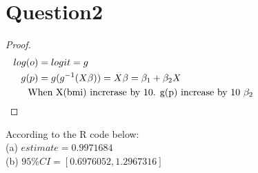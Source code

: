 \documentclass[15pt,a4paper]{article}\usepackage[]{graphicx}\usepackage[]{color}
\begin{document}
\section{Question2}
\begin{proof}
    \begin{align*}
    log(o) &= logit = g\\
    g(p) &= g(g^{-1}(X\beta)) = X\beta = \beta_1 + \beta_2 X\\
    \noalign{\text{When X(bmi) increrase by 10. g(p) increase by $10\ \beta_2$}}
    \end{align*}
\end{proof}
According to the R code below:\\
(a) $estimate = 0.9971684$\\
(b) $95\% CI = [0.6976052, 1.2967316]$\\
\end{document}
